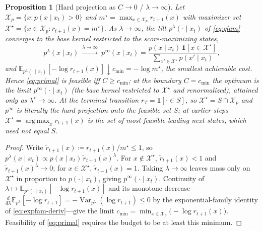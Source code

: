 \documentclass{article}
\newtheorem{proposition}{Proposition}
\DeclareMathOperator{\Var}{Var}
\DeclareMathOperator*{\argmax}{arg\,max}
\newcommand{\E}{\mathbb{E}}
\newcommand{\X}{\mathcal{X}}
\newcommand{\lstar}{\lambda^{\star}}
\begin{document}
\begin{proposition}[Hard projection as $C\to0$ / $\lambda\to\infty$]
\label{prop:hard}
Let $\X_p=\{x:p(x\mid x_t)>0\}$ and $m^\star=\max_{x\in\X_p}r_{t+1}(x)$ with maximizer set $\X^\star=\{x\in\X_p:r_{t+1}(x)=m^\star\}$. As $\lambda\to\infty$, the tilt $p^{\lambda}(\cdot\mid x_t)$ of \eqref{eq:qlam} converges to the base kernel restricted to the score-maximizing states,
\begin{equation}
p^{\lambda}(x\mid x_t)\ \xrightarrow{\lambda\to\infty}\
p^{\infty}(x\mid x_t)=\frac{p(x\mid x_t)\,\mathbf 1[x\in\X^\star]}{\sum_{x'\in\X^\star}p(x'\mid x_t)},
\end{equation}
and $\E_{p^{\lambda}(\cdot\mid x_t)}[-\log r_{t+1}(x)]\downarrow c_{\min}=-\log m^\star$, the smallest achievable cost. Hence \eqref{eq:primal} is feasible iff $C\ge c_{\min}$; at the boundary $C=c_{\min}$ the optimum is the limit $p^{\infty}(\cdot\mid x_t)$ (the base kernel restricted to $\X^\star$ and renormalized), attained only as $\lstar\to\infty$. At the terminal transition $r_T=\mathbf 1[\cdot\in S]$, so $\X^\star=S\cap\X_p$ and $p^{\infty}$ is literally the hard projection onto the feasible set $S$; at earlier steps $\X^\star=\argmax_x r_{t+1}(x)$ is the set of most-feasible-leading next states, which need not equal $S$.
\end{proposition}
\begin{proof}
Write $\tilde r_{t+1}(x)\coloneqq r_{t+1}(x)/m^\star\le1$, so $p^{\lambda}(x\mid x_t)\propto p(x\mid x_t)\,\tilde r_{t+1}(x)^\lambda$. For $x\notin\X^\star$, $\tilde r_{t+1}(x)<1$ and $\tilde r_{t+1}(x)^\lambda\to0$; for $x\in\X^\star$, $\tilde r_{t+1}(x)=1$. Taking $\lambda\to\infty$ leaves mass only on $\X^\star$ in proportion to $p(\cdot\mid x_t)$, giving $p^{\infty}(\cdot\mid x_t)$. Continuity of $\lambda\mapsto\E_{p^{\lambda}(\cdot\mid x_t)}[-\log r_{t+1}(x)]$ and its monotone decrease---$\tfrac{d}{d\lambda}\E_{p^{\lambda}}[-\log r_{t+1}]=-\Var_{p^{\lambda}}(\log r_{t+1})\le0$ by the exponential-family identity of \eqref{eq:expfam-deriv}---give the limit $c_{\min}=\min_{x\in\X_p}\big(-\log r_{t+1}(x)\big)$. Feasibility of \eqref{eq:primal} requires the budget to be at least this minimum.
\end{proof}
\end{document}
